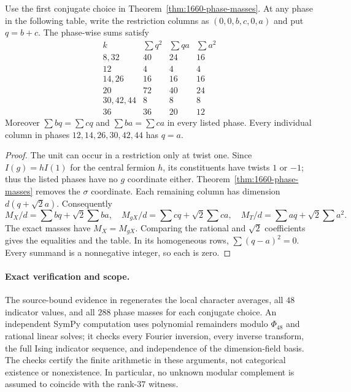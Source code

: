 \begin{corollary}
\label{cor:1660-homogeneous-phase-grams}
Use the first conjugate choice in Theorem~\ref{thm:1660-phase-masses}.
At any phase in the following table, write the restriction columns as
$(0,0,b,c,0,a)$ and put $q=b+c$. The phase-wise sums satisfy
\[
\begin{array}{c|rrr}
 k&\sum q^2&\sum qa&\sum a^2\\\hline
 8,32&40&24&16\\
 12&4&4&4\\
 14,26&16&16&16\\
 20&72&40&24\\
 30,42,44&8&8&8\\
 36&36&20&12
\end{array}
\]
Moreover $\sum bq=\sum cq$ and $\sum ba=\sum ca$ in every
listed phase. Every individual column in phases
$12,14,26,30,42,44$ has $q=a$.
\end{corollary}
\begin{proof}
The unit can occur in a restriction only at twist one. Since
$I(g)=hI(1)$ for the central fermion $h$, its constituents have twists
$1$ or $-1$; thus the listed phases have no $g$ coordinate either.
Theorem~\ref{thm:1660-phase-masses} removes the $\sigma$ coordinate.
Each remaining column has dimension $d(q+\sqrt2a)$. Consequently
\[
 M_X/d=\sum bq+\sqrt2\sum ba,\quad
 M_{gX}/d=\sum cq+\sqrt2\sum ca,\quad
 M_T/d=\sum aq+\sqrt2\sum a^2.
\]
The exact masses have $M_X=M_{gX}$. Comparing the rational and
$\sqrt2$ coefficients gives the equalities and the table. In its
homogeneous rows, $\sum(q-a)^2=0$. Every summand is a nonnegative
integer, so each is zero.
\end{proof}

\paragraph{Exact verification and scope.}
The source-bound evidence in
 regenerates the
local character averages, all $48$ indicator values, and all $288$
phase masses for each conjugate choice. An independent SymPy computation
uses polynomial remainders modulo $\Phi_{48}$ and rational linear solves;
it checks every Fourier inversion, every inverse transform, the full
Ising indicator sequence, and independence of the dimension-field basis.
The checks certify the finite arithmetic in these arguments, not
categorical existence or nonexistence. In particular, no unknown modular
complement is assumed to coincide with the rank-$37$ witness.

